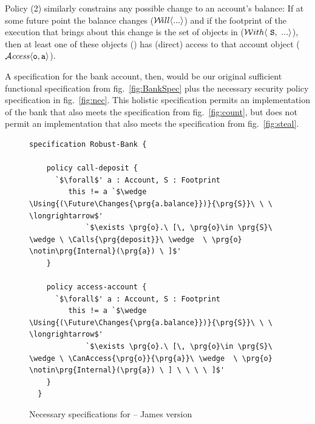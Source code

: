 Policy (2) similarly constrains any possible change to an 
account's balance: 
If at some future point the balance changes   (${\Future{...}}$) %
and if the footprint of the
execution that brings about this change is the set of objects in  (\ie $\Using{...}{\prg{S}}$), then 
at least one of these objects () has (direct) access to that account object
($\CanAccess{\prg{o}}{\prg{a}}$).


A  specification for the bank account, then,
would be our original sufficient functional specification from
fig.~\ref{fig:BankSpec} plus the necessary security policy
specification in fig.~\ref{fig:nec}.   
{}
This holistic specification
permits an implementation of the bank that also meets the 
specification from fig.~\ref{fig:count}, but does not permit an
implementation that also meets the  specification from
fig.~\ref{fig:steal}.

{}



\begin{figure}[tbp]
\begin{lstlisting}[escapeinside=`']
  specification Robust-Bank {

    policy call-deposit {
      `$\forall$' a : Account, S : Footprint
         this != a `$\wedge \Using{(\Future\Changes{\prg{a.balance}})}{\prg{S}}\ \ \ \longrightarrow$'
             `$\exists \prg{o}.\ [\, \prg{o}\in \prg{S}\ \wedge \ \Calls{\prg{deposit}}\ \wedge  \ \prg{o} \notin\prg{Internal}(\prg{a}) \ ]$'  
    }

    policy access-account {
      `$\forall$' a : Account, S : Footprint
         this != a `$\wedge \Using{(\Future\Changes{\prg{a.balance}})}{\prg{S}}\ \ \ \longrightarrow$'
             `$\exists \prg{o}.\ [\, \prg{o}\in \prg{S}\ \wedge \ \CanAccess{\prg{o}}{\prg{a}}\ \wedge  \ \prg{o} \notin\prg{Internal}(\prg{a}) \ ] \ \ \ \ ]$'
    }
  }
\end{lstlisting}
\caption{Necessary specifications for  -- James version}
\label{fig:kjx}
\end{figure}


